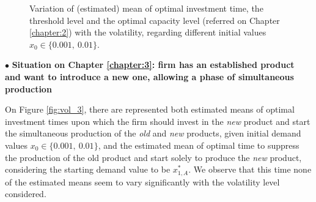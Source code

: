 \begin{figure}[!ht]
	\begin{subfigmatrix}{2}
	\end{subfigmatrix}
	\caption{Variation of (estimated) mean of optimal investment time, the threshold level and the optimal capacity level (referred on Chapter \ref{chapter:2}) with the volatility, regarding different initial values $x_0 \in \{0.001, \ 0.01\}$.}
	\label{fig:var_2}
\end{figure}




$\bullet$ \textbf{Situation on Chapter \ref{chapter:3}: firm has an established product and want to introduce a new one, allowing a phase of simultaneous production}


On Figure \ref{fig:vol_3}, there are represented both estimated means of optimal investment times upon which the firm should invest in the \textit{new} product and start the simultaneous production of the \textit{old} and \textit{new} products, given initial demand values $x_0 \in \{ 0.001, \ 0.01 \}$, and the estimated mean of optimal time to suppress the production of the old product and start solely to produce the \textit{new} product, considering the starting demand value to be $x_{1,A}^*$. We observe that this time none of the estimated means seem to vary significantly with the volatility level considered.


